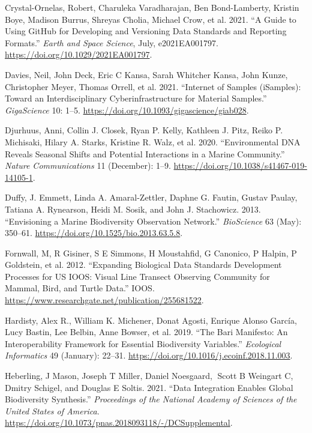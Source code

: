 \documentclass[
]{book}
\newlength{\cslhangindent}
\newlength{\cslentryspacingunit} %
\newenvironment{CSLReferences}[2] %
 {%
  \setlength{\parindent}{0pt}
  \ifodd #1
  \let\oldpar\par
  \def\par{\hangindent=\cslhangindent\oldpar}
  \fi
  \setlength{\parskip}{#2\cslentryspacingunit}
 }%
 {}
\begin{document}
\begin{CSLReferences}{1}{0}
\leavevmode{}%
Crystal-Ornelas, Robert, Charuleka Varadharajan, Ben Bond-Lamberty, Kristin Boye, Madison Burrus, Shreyas Cholia, Michael Crow, et al. 2021. {``A Guide to Using GitHub for Developing and Versioning Data Standards and Reporting Formats.''} \emph{Earth and Space Science}, July, e2021EA001797. \url{https://doi.org/10.1029/2021EA001797}.

\leavevmode{}%
Davies, Neil, John Deck, Eric C Kansa, Sarah Whitcher Kansa, John Kunze, Christopher Meyer, Thomas Orrell, et al. 2021. {``Internet of Samples (iSamples): Toward an Interdisciplinary Cyberinfrastructure for Material Samples.''} \emph{GigaScience} 10: 1--5. \url{https://doi.org/10.1093/gigascience/giab028}.

\leavevmode{}%
Djurhuus, Anni, Collin J. Closek, Ryan P. Kelly, Kathleen J. Pitz, Reiko P. Michisaki, Hilary A. Starks, Kristine R. Walz, et al. 2020. {``Environmental DNA Reveals Seasonal Shifts and Potential Interactions in a Marine Community.''} \emph{Nature Communications} 11 (December): 1--9. \url{https://doi.org/10.1038/s41467-019-14105-1}.

\leavevmode{}%
Duffy, J. Emmett, Linda A. Amaral-Zettler, Daphne G. Fautin, Gustav Paulay, Tatiana A. Rynearson, Heidi M. Sosik, and John J. Stachowicz. 2013. {``Envisioning a Marine Biodiversity Observation Network.''} \emph{BioScience} 63 (May): 350--61. \url{https://doi.org/10.1525/bio.2013.63.5.8}.

\leavevmode{}%
Fornwall, M, R Gisiner, S E Simmons, H Moustahfid, G Canonico, P Halpin, P Goldstein, et al. 2012. {``Expanding Biological Data Standards Development Processes for US IOOS: Visual Line Transect Observing Community for Mammal, Bird, and Turtle Data.''} IOOS. \url{https://www.researchgate.net/publication/255681522}.

\leavevmode{}%
Hardisty, Alex R., William K. Michener, Donat Agosti, Enrique Alonso García, Lucy Bastin, Lee Belbin, Anne Bowser, et al. 2019. {``The Bari Manifesto: An Interoperability Framework for Essential Biodiversity Variables.''} \emph{Ecological Informatics} 49 (January): 22--31. \url{https://doi.org/10.1016/j.ecoinf.2018.11.003}.

\leavevmode{}%
Heberling, J Mason, Joseph T Miller, Daniel Noesgaard, Scott B Weingart C, Dmitry Schigel, and Douglas E Soltis. 2021. {``Data Integration Enables Global Biodiversity Synthesis.''} \emph{Proceedings of the National Academy of Sciences of the United States of America}. \url{https://doi.org/10.1073/pnas.2018093118/-/DCSupplemental}.


\end{CSLReferences}
\end{document}
